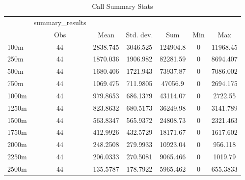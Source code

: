 \begin{table}[htbp]\centering
\caption{Call Summary Stats}
\begin{tabular}{l*{6}{c}}
\hline\hline
            &summary\_results&            &            &            &            &            \\
            &         Obs&        Mean&   Std. dev.&         Sum&         Min&         Max\\
\hline
100m        &          44&    2838.745&    3046.525&    124904.8&           0&    11968.45\\
250m        &          44&    1870.036&    1906.982&    82281.59&           0&    8694.407\\
500m        &          44&    1680.406&    1721.943&    73937.87&           0&    7086.002\\
750m        &          44&    1069.475&    711.9805&     47056.9&           0&    2694.175\\
1000m       &          44&    979.8653&    686.1379&    43114.07&           0&     2722.55\\
1250m       &          44&    823.8632&    680.5173&    36249.98&           0&    3141.789\\
1500m       &          44&    563.8347&    565.9372&    24808.73&           0&    2321.463\\
1750m       &          44&    412.9926&    432.5729&    18171.67&           0&    1617.602\\
2000m       &          44&    248.2508&    279.9933&    10923.04&           0&     956.118\\
2250m       &          44&    206.0333&    270.5081&    9065.466&           0&     1019.79\\
2500m       &          44&    135.5787&    178.7922&    5965.462&           0&    655.3833\\
\hline\hline
\end{tabular}
\end{table}

